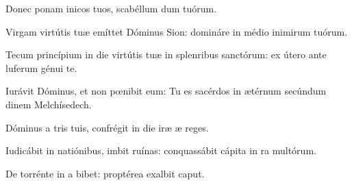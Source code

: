 \item {}

\item \psnonrepetitur{}Donec ponam inicos tuos,\psstar{} scabéllum dum tuórum.

\item Virgam virtútis tuæ emíttet Dóminus  Sion:\psstar{} domináre in médio inimirum tuórum.

\item Tecum princípium in die virtútis tuæ in splenribus sanctórum:\psstar{} ex útero ante luferum génui te.

\item Iurávit Dóminus, et non pœnibit eum:\psstar{} Tu es sacérdos in ætérnum secúndum dinem Melchísedech.

\item Dóminus a tris tuis,\psstar{} confrégit in die iræ æ reges.

\item Iudicábit in natiónibus, imbit ruínas:\psstar{} conquassábit cápita in ra multórum.

\item De torrénte in a bibet:\psstar{} proptérea exalbit caput.
